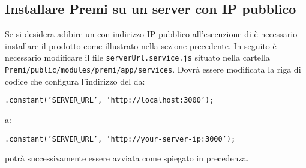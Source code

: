 \subsection{Installare Premi su un server con IP pubblico}
Se si desidera adibire un  con indirizzo IP pubblico all'esecuzione di \Premi è necessario installare il prodotto come illustrato nella sezione precedente. In seguito è necessario modificare il file \texttt{serverUrl.service.js} situato nella cartella \texttt{Premi/public/modules/premi/app/services}. Dovrà essere modificata la riga di codice che configura l'indirizzo del  da:
\begin{center}
\texttt{.constant('SERVER$\_$URL', 'http://localhost:3000');}
\end{center}
a:
\begin{center}
\texttt{.constant('SERVER$\_$URL', 'http://your-server-ip:3000');}
\end{center}
\Premi potrà successivamente essere avviata come spiegato in precedenza.
